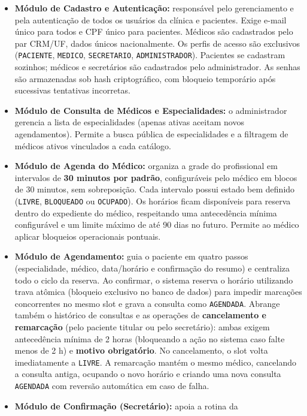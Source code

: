 \documentclass[12pt,a4paper]{article}
\providecommand{\tightlist}{%
  \setlength{\itemsep}{0pt}\setlength{\parskip}{0pt}}
\begin{document}
\begin{itemize}
\tightlist
\item
  \textbf{Módulo de Cadastro e Autenticação:} responsável pelo
  gerenciamento e pela autenticação de todos os usuários da clínica e
  pacientes. Exige e-mail único para todos e CPF único para pacientes.
  Médicos são cadastrados pelo par CRM/UF, dados únicos nacionalmente.
  Os perfis de acesso são exclusivos (\texttt{PACIENTE},
  \texttt{MEDICO}, \texttt{SECRETARIO}, \texttt{ADMINISTRADOR}).
  Pacientes se cadastram sozinhos; médicos e secretários são cadastrados
  pelo administrador. As senhas são armazenadas sob hash criptográfico,
  com bloqueio temporário após sucessivas tentativas incorretas.
\item
  \textbf{Módulo de Consulta de Médicos e Especialidades:} o
  administrador gerencia a lista de especialidades (apenas ativas
  aceitam novos agendamentos). Permite a busca pública de especialidades
  e a filtragem de médicos ativos vinculados a cada catálogo.
\item
  \textbf{Módulo de Agenda do Médico:} organiza a grade do profissional
  em intervalos de \textbf{30 minutos por padrão}, configuráveis pelo
  médico em blocos de 30 minutos, sem sobreposição. Cada intervalo
  possui estado bem definido (\texttt{LIVRE}, \texttt{BLOQUEADO} ou
  \texttt{OCUPADO}). Os horários ficam disponíveis para reserva dentro
  do expediente do médico, respeitando uma antecedência mínima
  configurável e um limite máximo de até 90 dias no futuro. Permite ao
  médico aplicar bloqueios operacionais pontuais.
\item
  \textbf{Módulo de Agendamento:} guia o paciente em quatro passos
  (especialidade, médico, data/horário e confirmação do resumo) e
  centraliza todo o ciclo da reserva. Ao confirmar, o sistema reserva o horário utilizando trava atômica (bloqueio exclusivo no banco de dados) para impedir marcações concorrentes no mesmo slot e grava a consulta como \texttt{AGENDADA}. Abrange também o
  histórico de consultas e as operações de \textbf{cancelamento e
  remarcação} (pelo paciente titular ou pelo secretário): ambas exigem
  antecedência mínima de 2 horas (bloqueando a ação no sistema caso
  falte menos de 2 h) e \textbf{motivo obrigatório}. No cancelamento, o
  slot volta imediatamente a \texttt{LIVRE}. A remarcação mantém o mesmo
  médico, cancelando a consulta antiga, ocupando o novo horário e
  criando uma nova consulta \texttt{AGENDADA} com reversão automática em
  caso de falha.
\item
  \textbf{Módulo de Confirmação (Secretário):} apoia a rotina da

\end{itemize}
\end{document}
